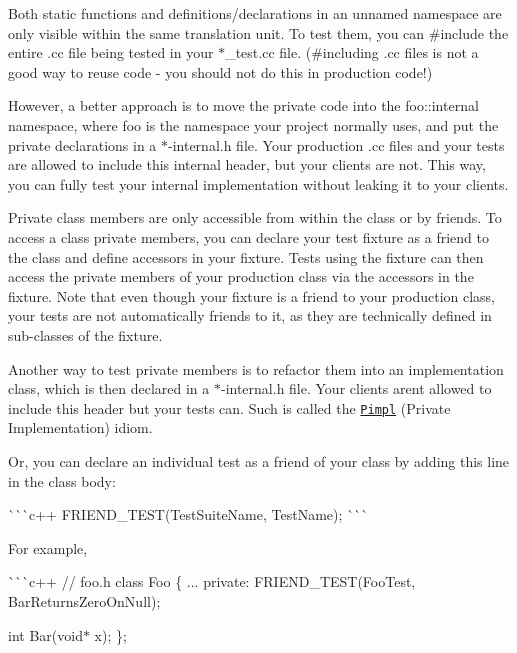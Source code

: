 \begin{DoxyItemize}
\item Both static functions and definitions/declarations in an unnamed namespace are only visible within the same translation unit. To test them, you can {\ttfamily \#include} the entire {\ttfamily .cc} file being tested in your {\ttfamily $\ast$\+\_\+test.cc} file. (\#including {\ttfamily .cc} files is not a good way to reuse code -\/ you should not do this in production code!)

However, a better approach is to move the private code into the {\ttfamily foo\+::internal} namespace, where {\ttfamily foo} is the namespace your project normally uses, and put the private declarations in a {\ttfamily $\ast$-\/internal.h} file. Your production {\ttfamily .cc} files and your tests are allowed to include this internal header, but your clients are not. This way, you can fully test your internal implementation without leaking it to your clients.
\item Private class members are only accessible from within the class or by friends. To access a class\textquotesingle{} private members, you can declare your test fixture as a friend to the class and define accessors in your fixture. Tests using the fixture can then access the private members of your production class via the accessors in the fixture. Note that even though your fixture is a friend to your production class, your tests are not automatically friends to it, as they are technically defined in sub-\/classes of the fixture.

Another way to test private members is to refactor them into an implementation class, which is then declared in a {\ttfamily $\ast$-\/internal.h} file. Your clients aren\textquotesingle{}t allowed to include this header but your tests can. Such is called the \href{https://www.gamedev.net/articles/programming/general-and-gameplay-programming/the-c-pimpl-r1794/}{\tt Pimpl} (Private Implementation) idiom.

Or, you can declare an individual test as a friend of your class by adding this line in the class body\+:

\`{}\`{}\`{}c++ F\+R\+I\+E\+N\+D\+\_\+\+T\+E\+S\+T(\+Test\+Suite\+Name, Test\+Name); \`{}\`{}\`{}

For example,

\`{}\`{}\`{}c++ // foo.\+h class Foo \{ ... private\+: F\+R\+I\+E\+N\+D\+\_\+\+T\+E\+S\+T(\+Foo\+Test, Bar\+Returns\+Zero\+On\+Null);

int Bar(void$\ast$ x); \};


\end{DoxyItemize}
